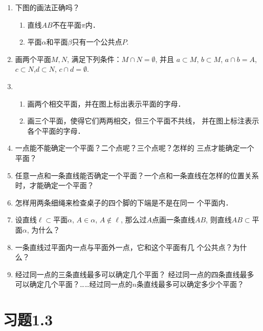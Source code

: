 \begin{ex}
\begin{enumerate}
  \item 下图的画法正确吗？
\begin{enumerate}
  \item 直线$AB$不在平面$\pi$内．
  \item 平面$\alpha$和平面$\beta$只有一个公共点$P$.
\end{enumerate}

\item 画两个平面$M,N$, 满足下列条件：$M\cap N=\emptyset$, 并且
  $a\subset M$, $b\subset M$, $a\cap b=A$, $c\subset N$,$d\subset N$, $c\cap d=\emptyset$.
  \item 
\begin{enumerate}
  \item 画两个相交平面，并在图上标出表示平面的字母．
  \item 画三个平面，使得它们两两相交，但三个平面不共线，
  并在图上标注表示各个平面的字母．
\end{enumerate}  
  \item 一点能不能确定一个平面？二个点呢？三个点呢？怎样的
  三点才能确定一个平面？
  \item 任意一点和一条直线能否确定一个平面？一个点和一条直线在怎样的位置关系时，才能确定一个平面？
  \item 怎样用两条细绳来检查桌子的四个脚的下端是不是在同一
  个平面内．
  \item 设直线$\ell\subset$平面$\alpha$, $A\in\alpha$, $A\notin \ell$, 那么过$A$点画一条直线$AB$, 则直线$AB\subset $平面$\alpha$, 为什么？
  \item 一条直线过平面内一点与平面外一点，它和这个平面有几
个公共点？为什么？
\item 经过同一点的三条直线最多可以确定几个平面？
经过同一点的四条直线最多可以确定几个平面？……经过同一点的$n$条直线最多可以确定多少个平面？
\end{enumerate}
\end{ex}


\section*{习题1.3}

